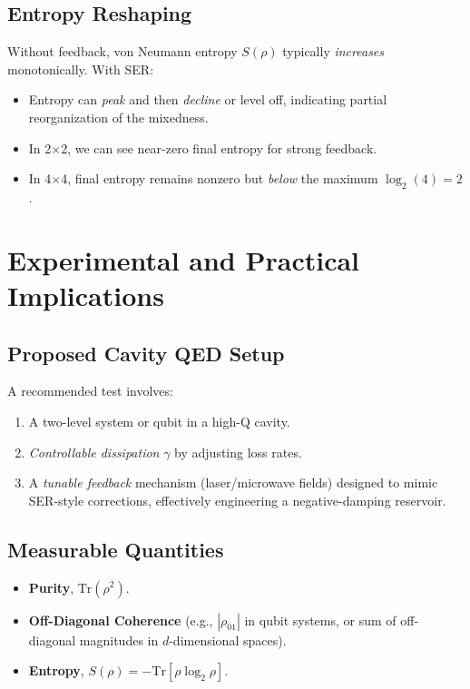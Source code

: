 \documentclass{article}
\begin{document}
\subsection{Entropy Reshaping}
Without feedback, von Neumann entropy $S(\rho)$ typically \emph{increases} monotonically. With SER:
\begin{itemize}
\item Entropy can \emph{peak} and then \emph{decline} or level off, indicating partial reorganization of the mixedness.
\item In 2$\times$2, we can see near-zero final entropy for strong feedback.
\item In 4$\times$4, final entropy remains nonzero but \emph{below} the maximum $\log_2(4)=2$.
\end{itemize}

\section{Experimental and Practical Implications}

\subsection{Proposed Cavity QED Setup}
A recommended test involves:
\begin{enumerate}
\item A two-level system or qubit in a high-Q cavity.
\item \emph{Controllable dissipation} $\gamma$ by adjusting loss rates.
\item A \emph{tunable feedback} mechanism (laser/microwave fields) designed to mimic SER-style corrections, effectively engineering a negative-damping reservoir.
\end{enumerate}

\subsection{Measurable Quantities}
\begin{itemize}
\item \textbf{Purity}, $\mathrm{Tr}(\rho^2)$.
\item \textbf{Off-Diagonal Coherence} (e.g., $|\rho_{01}|$ in qubit systems, or sum of off-diagonal magnitudes in $d$-dimensional spaces).
\item \textbf{Entropy}, $S(\rho)=-\mathrm{Tr}[\rho \log_2\rho]$.
\end{itemize}
\end{document}
